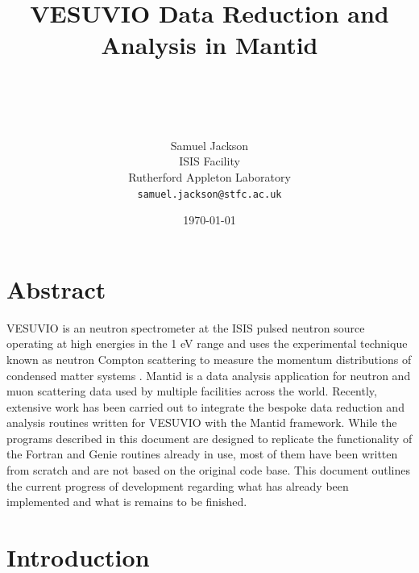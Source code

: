 \documentclass[paper=a4, fontsize=11pt]{scrartcl}	%
\title{ \vspace{-1in} 	\usefont{OT1}{bch}{b}{n}
		\huge \strut VESUVIO Data Reduction and Analysis in Mantid \strut \\
}
\author{ 									\usefont{OT1}{bch}{m}{n}
        Samuel Jackson\\		\usefont{OT1}{bch}{m}{n}
        ISIS Facility\\	\usefont{OT1}{bch}{m}{n}
        Rutherford Appleton Laboratory\\
        \texttt{samuel.jackson@stfc.ac.uk}
}
\date{\today}
\numberwithin{equation}{section}															%
\numberwithin{figure}{section}																%
\numberwithin{table}{section}
\begin{document}
\maketitle
\clearpage
\tableofcontents
\clearpage

\section{Abstract}
VESUVIO is an neutron spectrometer at the ISIS pulsed neutron source operating at high energies in the 1 eV range and uses the experimental technique known as neutron Compton scattering to measure the momentum distributions of condensed matter systems \citep{mayers2012vesuvio}. Mantid \citep{mantid} is a data analysis application for neutron and muon scattering data used by multiple facilities across the world. Recently, extensive work has been carried out to integrate the bespoke data reduction and analysis routines written for VESUVIO with the Mantid framework. While the programs described in this document are designed to replicate the functionality of the Fortran and Genie routines already in use, most of them have been written from scratch and are not based on the original code base. This document outlines the current progress of development regarding what has already been implemented and what is remains to be finished.

\clearpage
\section{Introduction}
\label{sec:introduction}
\end{document}
